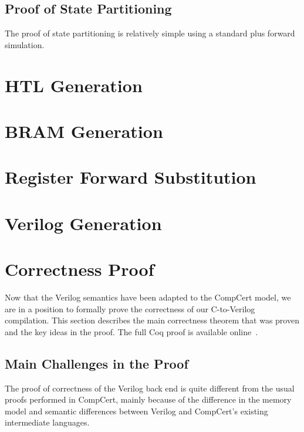 \subsection{Proof of State Partitioning}

The proof of state partitioning is relatively simple using a standard plus
forward simulation.

\section{HTL Generation}%
\label{sec:hg:htl-generation}

\section{BRAM Generation}%
\label{sec:hg:bram-generation}

\section{Register Forward Substitution}%
\label{sec:hg:register-forward-substitution}

\section{Verilog Generation}%
\label{sec:hg:verilog-generation}

\section{Correctness Proof}\label{sec:proof}


Now that the Verilog semantics have been adapted to the CompCert model, we are
in a position to formally prove the correctness of our C-to-Verilog compilation.
This section describes the main correctness theorem that was proven and the key
ideas in the proof. The full Coq proof is available
online~\cite{yann_herklotz_2021_5093839}.

\subsection{Main Challenges in the Proof}

The proof of correctness of the Verilog back end is quite different from the usual proofs performed in CompCert, mainly because of the difference in the memory model and semantic differences between Verilog and CompCert's existing intermediate languages.

